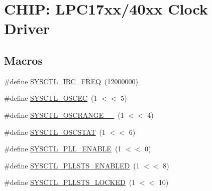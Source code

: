 \hypertarget{group__CLOCK__17XX__40XX}{}\section{C\+H\+IP\+: L\+P\+C17xx/40xx Clock Driver}
\label{group__CLOCK__17XX__40XX}
\subsection*{Macros}
\begin{DoxyCompactItemize}
\item 
\#define \hyperlink{group__CLOCK__17XX__40XX_gadec816f1cc26d1b3c4a954d5e791e9c0}{S\+Y\+S\+C\+T\+L\+\_\+\+I\+R\+C\+\_\+\+F\+R\+EQ}~(12000000)
\item 
\#define \hyperlink{group__CLOCK__17XX__40XX_ga590cc793271161c9b49e27345956b527}{S\+Y\+S\+C\+T\+L\+\_\+\+O\+S\+C\+EC}~(1 $<$$<$ 5)
\item 
\#define \hyperlink{group__CLOCK__17XX__40XX_gaf04369ab801acde194d9ffa65437364b}{S\+Y\+S\+C\+T\+L\+\_\+\+O\+S\+C\+R\+A\+N\+G\+E\+\_\+\_}~(1 $<$$<$ 4)
\item 
\#define \hyperlink{group__CLOCK__17XX__40XX_gae0252af1bba39952df3137fc471ae395}{S\+Y\+S\+C\+T\+L\+\_\+\+O\+S\+C\+S\+T\+AT}~(1 $<$$<$ 6)
\item 
\#define \hyperlink{group__CLOCK__17XX__40XX_ga78f6b62e70d59854ada7a72d6a01893d}{S\+Y\+S\+C\+T\+L\+\_\+\+P\+L\+L\+\_\+\+E\+N\+A\+B\+LE}~(1 $<$$<$ 0)
\item 
\#define \hyperlink{group__CLOCK__17XX__40XX_ga9cbb95ab3333cf966d3adcd375fb2759}{S\+Y\+S\+C\+T\+L\+\_\+\+P\+L\+L\+S\+T\+S\+\_\+\+E\+N\+A\+B\+L\+ED}~(1 $<$$<$ 8)
\item 
\#define \hyperlink{group__CLOCK__17XX__40XX_ga83355c269f77d2fbc095a9f7be29b128}{S\+Y\+S\+C\+T\+L\+\_\+\+P\+L\+L\+S\+T\+S\+\_\+\+L\+O\+C\+K\+ED}~(1 $<$$<$ 10)
\end{DoxyCompactItemize}
